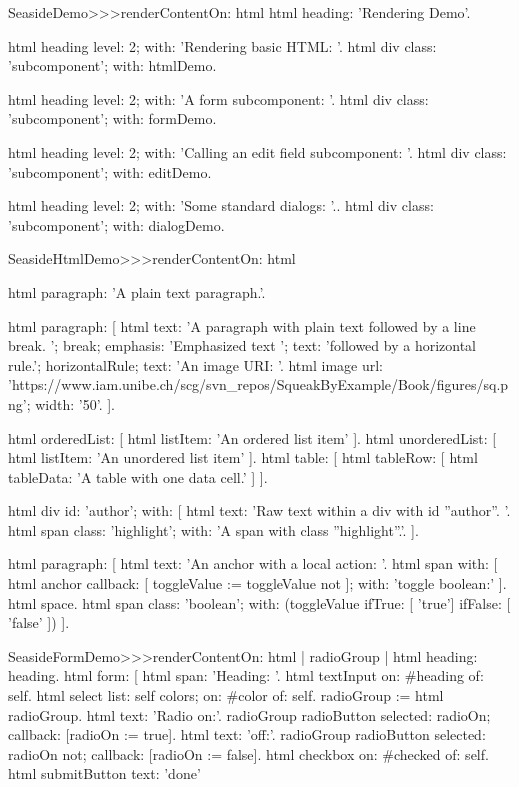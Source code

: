 \documentclass[a4paper,10pt,twoside]{book}
\begin{document}

\begin{code}{}
SeasideDemo>>>renderContentOn: html
	html heading: 'Rendering Demo'.

	html heading
		level: 2;
		with: 'Rendering basic HTML: '.
	html div
		class: 'subcomponent';
		with: htmlDemo.

	html heading
		level: 2;
		with: 'A form subcomponent: '.
	html div
		class: 'subcomponent';
		with: formDemo.

	html heading
		level: 2;
		with: 'Calling an edit field subcomponent: '.
	html div
		class: 'subcomponent';
		with: editDemo.

	html heading
		level: 2;
		with: 'Some standard dialogs: '..
	html div
		class: 'subcomponent';
		with: dialogDemo.


SeasideHtmlDemo>>>renderContentOn: html

	html paragraph: 'A plain text paragraph.'.

	html paragraph: [
		html
			text: 'A paragraph with plain text followed by a line break. ';
			break;
			emphasis: 'Emphasized text ';
			text: 'followed by a horizontal rule.';
			horizontalRule;
			text: 'An image URI: '.
			html image
				url: 'https://www.iam.unibe.ch/scg/svn_repos/SqueakByExample/Book/figures/sq.png';
				width: '50'.
		].

	html orderedList: [ html listItem: 'An ordered list item' ].
	html unorderedList: [ html listItem: 'An unordered list item' ].
	html table: [ html tableRow: [ html tableData: 'A table with one data cell.' ] ].

	html div id: 'author';
		with: [
			html text: 'Raw text within a div with id ''author''. '.
			html span class: 'highlight'; with: 'A span with class ''highlight''.'. ].

	html paragraph: [
		html text: 'An anchor with a local action: '.
		html span
			with: [
				html anchor
					callback: [ toggleValue := toggleValue not ];
					with: 'toggle boolean:'
			].
		html space.
		html span
			class: 'boolean';
			with: (toggleValue ifTrue: [ 'true'] ifFalse: [ 'false' ])
		].


SeasideFormDemo>>>renderContentOn: html
	| radioGroup |
	html heading: heading.
	html form: [
		html span: 'Heading: '.
		html textInput on: #heading of: self.
		html select
			list: self colors;
			on: #color of: self.
		radioGroup := html radioGroup.
		html text: 'Radio on:'.
		radioGroup radioButton
			selected: radioOn;
			callback: [radioOn := true].
		html text: 'off:'.
		radioGroup radioButton
			selected: radioOn not;
			callback: [radioOn := false].
		html checkbox on: #checked of: self.
		html submitButton
			text: 'done'
			

\end{code}
\end{document}
